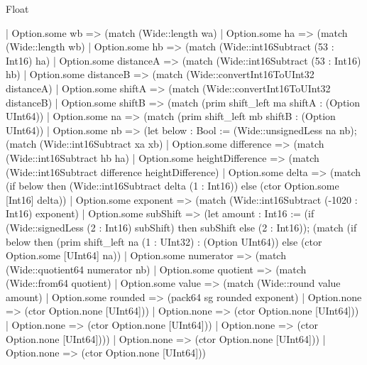 \begin{lexlean}{Float}
\begin{semanticmodule}
{                  | Option.some wb => (match (Wide::length wa)
                    | Option.some ha => (match (Wide::length wb)
                      | Option.some hb => (match (Wide::int16Subtract (53 : Int16) ha)
                        | Option.some distanceA => (match (Wide::int16Subtract (53 : Int16) hb)
                          | Option.some distanceB => (match (Wide::convertInt16ToUInt32 distanceA)
                            | Option.some shiftA => (match (Wide::convertInt16ToUInt32 distanceB)
                              | Option.some shiftB => (match (prim shift_left ma shiftA : (Option UInt64))
                                | Option.some na => (match (prim shift_left mb shiftB : (Option UInt64))
                                  | Option.some nb => (let below : Bool := (Wide::unsignedLess na nb); (match (Wide::int16Subtract xa xb)
                                    | Option.some difference => (match (Wide::int16Subtract hb ha)
                                      | Option.some heightDifference => (match (Wide::int16Subtract difference heightDifference)
                                        | Option.some delta => (match (if below then (Wide::int16Subtract delta (1 : Int16)) else (ctor Option.some [Int16] delta))
                                          | Option.some exponent => (match (Wide::int16Subtract (-1020 : Int16) exponent)
                                            | Option.some subShift => (let amount : Int16 := (if (Wide::signedLess (2 : Int16) subShift) then subShift else (2 : Int16)); (match (if below then (prim shift_left na (1 : UInt32) : (Option UInt64)) else (ctor Option.some [UInt64] na))
                                              | Option.some numerator => (match (Wide::quotient64 numerator nb)
                                                | Option.some quotient => (match (Wide::from64 quotient)
                                                  | Option.some value => (match (Wide::round value amount)
                                                    | Option.some rounded => (pack64 sg rounded exponent)
                                                    | Option.none => (ctor Option.none [UInt64]))
                                                  | Option.none => (ctor Option.none [UInt64]))
                                                | Option.none => (ctor Option.none [UInt64]))
                                              | Option.none => (ctor Option.none [UInt64])))
                                            | Option.none => (ctor Option.none [UInt64]))
                                          | Option.none => (ctor Option.none [UInt64]))
}
\end{semanticmodule}
\end{lexlean}
